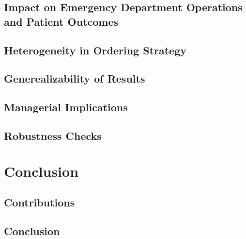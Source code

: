 \documentclass[,mnsc,nonblindrev]{informs}
\begin{document}
\hypertarget{impact-on-emergency-department-operations-and-patient-outcomes}{%
\subsection{Impact on Emergency Department Operations and Patient
Outcomes}\label{impact-on-emergency-department-operations-and-patient-outcomes}}

\hypertarget{heterogeneity-in-ordering-strategy}{%
\subsection{Heterogeneity in Ordering
Strategy}\label{heterogeneity-in-ordering-strategy}}

\hypertarget{generealizability-of-results}{%
\subsection{Generealizability of
Results}\label{generealizability-of-results}}

\hypertarget{managerial-implications}{%
\subsection{Managerial Implications}\label{managerial-implications}}

\hypertarget{robustness-checks}{%
\subsection{Robustness Checks}\label{robustness-checks}}

\hypertarget{conclusion}{%
\section{Conclusion}\label{conclusion}}

\hypertarget{contributions}{%
\subsection{Contributions}\label{contributions}}

\hypertarget{conclusion-1}{%
\subsection{Conclusion}\label{conclusion-1}}

\newpage
\end{document}

